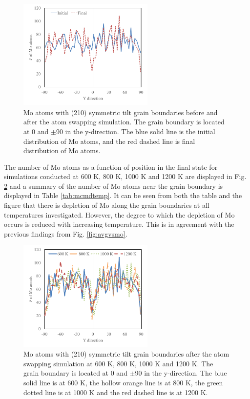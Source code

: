 \documentclass[review]{elsarticle}
\begin{document}
\begin{figure}[h]
 \centering
 \includegraphics[width=0.6\textwidth]{600mcmdA.png} 
 \caption{Mo atoms with (210) symmetric tilt grain boundaries before and after the atom swapping simulation. The grain boundary is located at 0 and $\pm$90 in the y-direction. The blue solid line is the initial distribution of Mo atoms, and the red dashed line is final distribution of Mo atoms.}
 \label{fig:600mcmdA}
\end{figure}

\FloatBarrier

The number of Mo atoms as a function of position in the final state for simulations conducted at 600 K, 800 K, 1000 K and 1200 K are displayed in Fig. \ref{fig:mcmdtemp} and a summary of the number of Mo atoms near the grain boundary is displayed in Table \ref{tab:mcmdtemp}. It can be seen from both the table and the figure that there is depletion of Mo along the grain boundaries at all temperatures investigated. However, the degree to which the depletion of Mo occurs is reduced with increasing temperature. This is in agreement with the previous findings from Fig. \ref{fig:avgvsmo}. 
 
\begin{figure}[h]
 \centering
 \includegraphics[width=0.6\textwidth]{mcmdtemp.png} 
 \caption{Mo atoms with (210) symmetric tilt grain boundaries after the atom swapping simulation at 600 K, 800 K, 1000 K and 1200 K. The grain boundary is located at 0 and $\pm$90 in the y-direction. The blue solid line is at 600 K, the hollow orange line is at 800 K, the green dotted line is at 1000 K and the red dashed line is at 1200 K.}
 \label{fig:mcmdtemp}
\end{figure}
\end{document}

